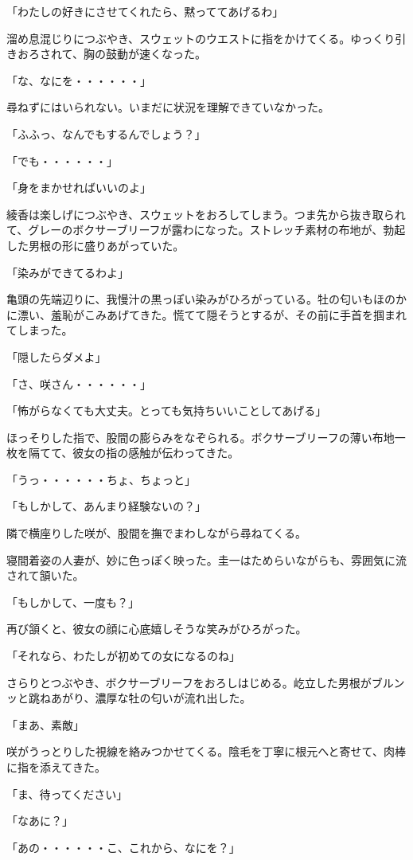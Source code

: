 ﻿\documentclass[book,tate]{jlreq}
\begin{document}
「わたしの好きにさせてくれたら、黙っててあげるわ」

溜め息混じりにつぶやき、スウェットのウエストに指をかけてくる。ゆっくり引きおろされて、胸の鼓動が速くなった。

「な、なにを・・・・・・」

尋ねずにはいられない。いまだに状況を理解できていなかった。

「ふふっ、なんでもするんでしょう？」

「でも・・・・・・」

「身をまかせればいいのよ」

綾香は楽しげにつぶやき、スウェットをおろしてしまう。つま先から抜き取られて、グレーのボクサーブリーフが露わになった。ストレッチ素材の布地が、勃起した男根の形に盛りあがっていた。

「染みができてるわよ」

亀頭の先端辺りに、我慢汁の黒っぽい染みがひろがっている。牡の匂いもほのかに漂い、羞恥がこみあげてきた。慌てて隠そうとするが、その前に手首を掴まれてしまった。

「隠したらダメよ」

「さ、咲さん・・・・・・」

「怖がらなくても大丈夫。とっても気持ちいいことしてあげる」

ほっそりした指で、股間の膨らみをなぞられる。ボクサーブリーフの薄い布地一枚を隔てて、彼女の指の感触が伝わってきた。

「うっ・・・・・・ちょ、ちょっと」

「もしかして、あんまり経験ないの？」

隣で横座りした咲が、股間を撫でまわしながら尋ねてくる。

寝間着姿の人妻が、妙に色っぽく映った。圭一はためらいながらも、雰囲気に流されて頷いた。

「もしかして、一度も？」

再び頷くと、彼女の顔に心底嬉しそうな笑みがひろがった。

「それなら、わたしが初めての女になるのね」

さらりとつぶやき、ボクサーブリーフをおろしはじめる。屹立した男根がブルンッと跳ねあがり、濃厚な牡の匂いが流れ出した。

「まあ、素敵」

咲がうっとりした視線を絡みつかせてくる。陰毛を丁寧に根元へと寄せて、肉棒に指を添えてきた。

「ま、待ってください」

「なあに？」

「あの・・・・・・こ、これから、なにを？」
\end{document}
